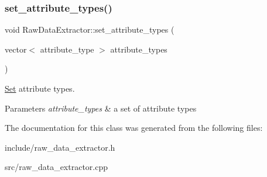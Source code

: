 \subsubsection{\texorpdfstring{set\+\_\+attribute\+\_\+types()}{set\_attribute\_types()}}
{\footnotesize\ttfamily void Raw\+Data\+Extractor\+::set\+\_\+attribute\+\_\+types (\begin{DoxyParamCaption}\item[{vector$<$ attribute\+\_\+type $>$}]{attribute\+\_\+types }\end{DoxyParamCaption})}

\hyperlink{classSet}{Set} attribute types. 
\begin{DoxyParams}{Parameters}
{\em attribute\+\_\+types} & a set of attribute types \\
\hline
\end{DoxyParams}


The documentation for this class was generated from the following files\+:\begin{DoxyCompactItemize}
\item 
include/raw\+\_\+data\+\_\+extractor.\+h\item 
src/raw\+\_\+data\+\_\+extractor.\+cpp\end{DoxyCompactItemize}
